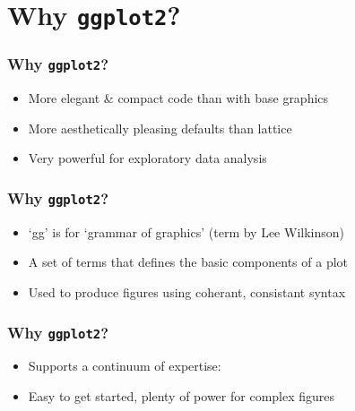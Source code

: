 \documentclass{beamer}\usepackage[]{graphicx}\usepackage[]{color}
\begin{document}
\section*{Why \texttt{ggplot2}?}
\frame{\sectionpage}


\begin{frame}[fragile]
\frametitle{Why \texttt{ggplot2}?}
\begin{itemize}
\item More elegant \& compact code than with base graphics\\
\item More aesthetically pleasing defaults than lattice\\
\item Very powerful for exploratory data analysis\\
\end{itemize}
\end{frame}


\begin{frame}[fragile]
\frametitle{Why \texttt{ggplot2}?}
\begin{itemize}
\item `gg' is for `grammar of graphics' (term by Lee Wilkinson)\\
\item A set of terms that defines the basic components of a plot\\
\item Used to produce figures using coherant, consistant syntax\\
\end{itemize}
\end{frame}


\begin{frame}[fragile]
\frametitle{Why \texttt{ggplot2}?}
\begin{itemize}
\item Supports a continuum of expertise:
\item Easy to get started, plenty of power for complex figures 
\end{itemize}
\end{frame}

\end{document}
